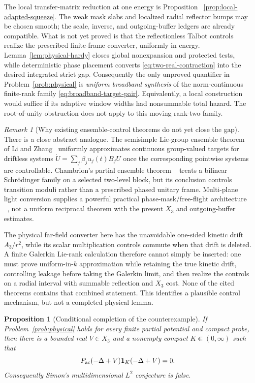 \documentclass[11pt]{article}
\newtheorem{proposition}[theorem]{Proposition}
\theoremstyle{remark}
\newtheorem{remark}[theorem]{Remark}
\begin{document}
The local transfer-matrix reduction at one energy is Proposition
~\ref{prop:local-adapted-squeeze}.  The weak mask slabs and localized radial
reflector bumps may be chosen smooth; the scale, inverse, and outgoing-buffer
ledgers are already compatible.  What is not yet proved is that the
reflectionless Talbot controls realize the prescribed finite-frame converter,
uniformly in energy.  Lemma~\ref{lem:physical-hardy} closes global
nonexpansion and protected tests, while deterministic phase placement converts
\eqref{eq:two-real-contraction} into the desired integrated strict gap.
Consequently the only unproved quantifier in Problem~\ref{prob:physical} is
\emph{uniform broadband synthesis} of the norm-continuous finite-rank family
\eqref{eq:broadband-target-pair}.  Equivalently, a local construction would
suffice if its adaptive window widths had nonsummable total hazard.  The
root-of-unity obstruction does not apply to this moving rank-two family.

\begin{remark}[Why existing ensemble-control theorems do not yet close the gap]
There is a close abstract analogue.  The semisimple Lie-group ensemble theorem
of Li and Zhang~\cite{LiZhang2020} uniformly approximates continuous
group-valued targets for driftless systems
$\dot U=\sum_j\beta_j u_j(t)B_jU$ once the corresponding pointwise systems are
controllable.  Chambrion's partial ensemble theorem
~\cite{Chambrion2013} treats a bilinear Schr\"odinger family on a selected
two-level block, but its conclusion controls transition moduli rather than a
prescribed phased unitary frame.  Multi-plane light conversion supplies a
powerful practical phase-mask/free-flight architecture
~\cite{ZhangFontaine2023}, not a uniform reciprocal theorem with the present
$X_3$ and outgoing-buffer estimates.

The physical far-field converter here has the unavoidable one-sided kinetic
drift $A_3/r^2$, while its scalar multiplication controls commute when that
drift is deleted.  A finite Galerkin Lie-rank calculation therefore cannot
simply be inserted: one must prove uniform-in-$k$ approximation while retaining
the true kinetic drift, controlling leakage before taking the Galerkin limit,
and then realize the controls on a radial interval with summable reflection
and $X_3$ cost.  None of the cited theorems contains that combined statement.
This identifies a plausible control mechanism, but not a completed physical
lemma.
\end{remark}

\begin{proposition}[Conditional completion of the counterexample]
\label{prop:conditional-counterexample}
If Problem~\ref{prob:physical} holds for every finite partial potential and
compact probe, then there is a bounded real $V\in X_3$ and a nonempty compact
$K\Subset(0,\infty)$ such that
\[
 P_{\rm ac}(-\Delta+V)\mathbf1_K(-\Delta+V)=0.
\]
Consequently Simon's multidimensional $L^2$ conjecture is false.
\end{proposition}
\end{document}
